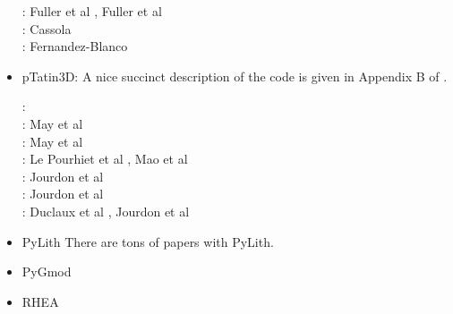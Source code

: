 \begin{itemize}
\begin{scriptsize}
\twothousandsix: Fuller et al \cite{fuwb06}, Fuller et al \cite{fuwf06}\\
\twothousandthirteen: Cassola \cite{cass13}\\
\twothousandtwenty: Fernandez-Blanco \cite{femb20}
\end{scriptsize}

\item pTatin3D: A nice succinct description of the code is given in Appendix B of \cite{lemh17}. 

\begin{scriptsize}
\twothousandthirteen: \cite{phil13}\\
\twothousandfourteen: May et al \cite{mabl14}\\
\twothousandfifteen: May et al \cite{mabl15}\\
\twothousandseventeen: Le Pourhiet et al \cite{lemh17}, Mao et al \cite{magm17}\\
\twothousandeighteen: Jourdon et al \cite{jolp18}\\
\twothousandnineteen: Jourdon et al \cite{jolm19}\\
\twothousandtwenty: Duclaux et al \cite{duhm20}, Jourdon et al \cite{jolm20}
\end{scriptsize}

\item PyLith 
There are tons of papers with PyLith. 

{\small
\noindent
\cite{aakw13}
}

\item PyGmod 

{\small
\noindent
\cite{crvs15}
}


\item RHEA 

{\small
\noindent
\cite{bugg08}
\cite{stgb10}
\cite{algs12}
\cite{busa13}
}


\end{itemize}
